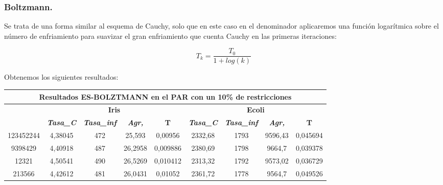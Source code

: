 \documentclass[12pt, spanish]{article}
\begin{document}
\newpage
\subsubsection{Boltzmann.}

Se trata de una forma similar al esquema de Cauchy, solo que en este caso en el denominador aplicaremos una función logarítmica sobre el número de enfriamiento para suavizar el gran enfriamiento que cuenta Cauchy en las primeras iteraciones:

$$ T_k = \frac{T_0}{1 + log(k)} $$

Obtenemos los siguientes resultados:

\begin{table}[H]
\begin{tabular}{|c|c|c|c|c|c|c|c|c|}
\hline
\multicolumn{9}{|c|}{\textbf{Resultados ES-BOLZTMANN en el PAR con un 10\% de restricciones}}                                                                                                                     \\ \hline
\multirow{2}{*}{} & \multicolumn{4}{c|}{\textbf{Iris}}                                                            & \multicolumn{4}{c|}{\textbf{Ecoli}}                                                           \\ \cline{2-9} 
                  & \textit{\textbf{Tasa\_C}} & \textit{\textbf{Tasa\_inf}} & \textit{\textbf{Agr,}} & \textbf{T} & \textit{\textbf{Tasa\_C}} & \textit{\textbf{Tasa\_inf}} & \textit{\textbf{Agr,}} & \textbf{T} \\ \hline
123452244         & 4,38045                   & 472                         & 25,593                 & 0,00956    & 2332,68                   & 1793                        & 9596,43                & 0,045694   \\ \hline
9398429           & 4,40918                   & 487                         & 26,2958                & 0,009886   & 2380,69                   & 1798                        & 9664,7                 & 0,039378   \\ \hline
12321             & 4,50541                   & 490                         & 26,5269                & 0,010412   & 2313,32                   & 1792                        & 9573,02                & 0,036729   \\ \hline
213566            & 4,42612                   & 481                         & 26,0431                & 0,01052    & 2361,72                   & 1778                        & 9564,7                 & 0,049526   \\ \hline

\end{tabular}
\end{table}
\end{document}

